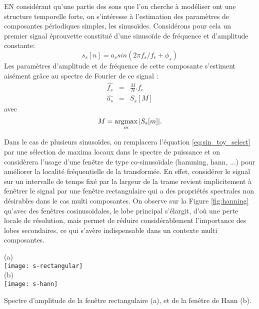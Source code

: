 EN considérant qu'une partie des sons que l'on cherche à modéliser ont une structure temporelle forte, on s'intéresse à l'estimation des paramètres de composantes périodiques simples, les sinusoïdes. Considérons pour cela un premier signal \og éprouvette \fg constitué d'une sinusoïde de fréquence et d'amplitude constante:
\begin{equation}
  s_s[n] = a_s sin(2\pi f_s/f_e + \phi_s)
  \label{eq:sin_toy}
\end{equation}
Les paramètres d'amplitude et de fréquence de cette composante s'estiment aisément grâce au spectre de Fourier de ce signal :
\begin{eqnarray}
  \hat{f_s} &=&  \frac{M}{N} . f_e\\
  \hat{a_s} &=& S_s[M]
\end{eqnarray}
avec
\begin{equation}
  M = \operatorname*{argmax}_m | S_s[m] |.
  \label{eq:sin_toy_select}
\end{equation}

Dans le cas de plusieurs sinusoïdes, on remplacera l'équation \ref{eq:sin_toy_select} par une sélection de maxima locaux dans le spectre de puissance et on considèrera l'usage d'une fenêtre de type co-sinusoïdale (hamming, hann, ...) pour améliorer la localité fréquentielle de la transformée\cite{harris1978use}. En effet, considérer le signal sur un intervalle de temps fixé par la largeur de la trame revient implicitement à fenêtrer le signal par une fenêtre rectangulaire qui a des propriétés spectrales non désirables dans le cas multi composantes. On observe sur la Figure \ref{fig:hanning} qu'avec des fenêtres cosinusoidales, le lobe principal s'élargit, d'où une perte locale de résolution, mais permet de réduire considérablement l'importance des lobes secondaires, ce qui s'avère indispensable dans un contexte multi composantes.

\begin{marginfigure}
  \label{fig:hanning}
  \begin{center}
  (a) \\
  \texttt{[image: s-rectangular]} \\
  (b) \\
  \texttt{[image: s-hann]}
\end{center}
  \caption{Spectre d'amplitude de la fenêtre rectangulaire (a), et de la fenêtre de Hann (b).}
\end{marginfigure}

